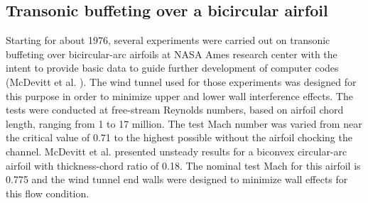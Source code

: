 %
%
%
\subsection{Transonic buffeting over a bicircular airfoil}
\label{transonic_buffeting.subsec}
%
 Starting for about 1976, several experiments were
 carried out on transonic buffeting over bicircular-arc airfoils
 at NASA Ames research center with the intent to provide
 basic data to guide further development of computer codes
 (McDevitt et al. ).
 The wind tunnel used for those experiments was designed for
 this purpose in order to minimize upper and lower wall
 interference effects. The tests were conducted at free-stream
 Reynolds numbers, based on airfoil chord length, ranging from 1
 to 17 million. The test Mach number was varied from near the critical
 value of 0.71 to the highest possible without the airfoil chocking
 the channel.
 McDevitt et al. \citeyear{McDevitt:1} presented unsteady results for
 a biconvex circular-arc airfoil with thickness-chord ratio of 0.18.
 The nominal test Mach for this airfoil is 0.775 and the wind
 tunnel end walls were designed to minimize wall effects for this flow
 condition.
%
%
